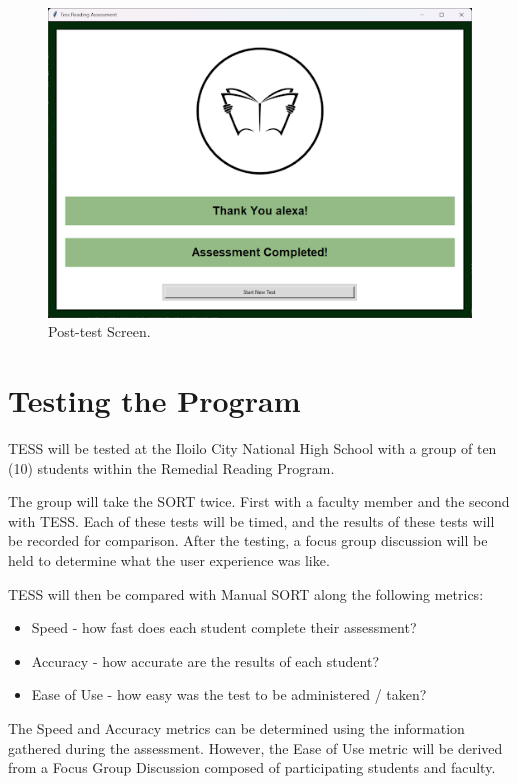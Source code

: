 \begin{figure}[!]
   \centering
   \includegraphics[scale = 0.6]{figures/Post-test-Screen.png}
   \caption{Post-test Screen.}
    \label{fig:posttestScreen}
\end{figure}

{\clearpage}

\section{Testing the Program}
TESS will be tested at the Iloilo City National High School with a group of ten (10) students within the Remedial Reading Program.

The group will take the SORT twice. First with a faculty member and the second with TESS. Each of these tests will be timed, and the results of these tests will be recorded for comparison.
After the testing, a focus group discussion will be held to determine what the user experience was like.

TESS will then be compared with Manual SORT along the following metrics:
\begin{itemize}
\item Speed - how fast does each student complete their assessment?
\item Accuracy - how accurate are the results of each student?
\item Ease of Use - how easy was the test to be administered / taken?
\end{itemize}

The Speed and Accuracy metrics can be determined using the information gathered during the assessment. However, the Ease of Use metric will be derived from a Focus Group Discussion composed of participating students and faculty.

